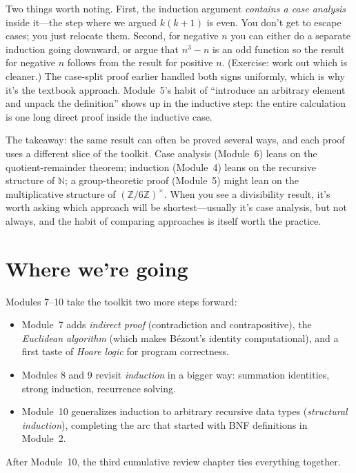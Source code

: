 \documentclass[11pt]{article}
\begin{document}
Two things worth noting. First, the induction argument \emph{contains a case analysis} inside it---the step where we argued $k(k+1)$ is even. You don't get to escape cases; you just relocate them. Second, for negative $n$ you can either do a separate induction going downward, or argue that $n^3 - n$ is an odd function so the result for negative $n$ follows from the result for positive $n$. (Exercise: work out which is cleaner.) The case-split proof earlier handled both signs uniformly, which is why it's the textbook approach. Module~5's habit of ``introduce an arbitrary element and unpack the definition'' shows up in the inductive step: the entire calculation is one long direct proof inside the inductive case.

The takeaway: the same result can often be proved several ways, and each proof uses a different slice of the toolkit. Case analysis (Module~6) leans on the quotient-remainder theorem; induction (Module~4) leans on the recursive structure of $\mathbb{N}$; a group-theoretic proof (Module~5) might lean on the multiplicative structure of $(\mathbb{Z}/6\mathbb{Z})^{\times}$. When you see a divisibility result, it's worth asking which approach will be shortest---usually it's case analysis, but not always, and the habit of comparing approaches is itself worth the practice.

\section*{Where we're going}

Modules 7--10 take the toolkit two more steps forward:
\begin{itemize}
  \item Module~7 adds \emph{indirect proof} (contradiction and contrapositive), the \emph{Euclidean algorithm} (which makes B\'ezout's identity computational), and a first taste of \emph{Hoare logic} for program correctness.
  \item Modules 8 and 9 revisit \emph{induction} in a bigger way: summation identities, strong induction, recurrence solving.
  \item Module~10 generalizes induction to arbitrary recursive data types (\emph{structural induction}), completing the arc that started with BNF definitions in Module~2.
\end{itemize}

After Module~10, the third cumulative review chapter ties everything together.
\end{document}
